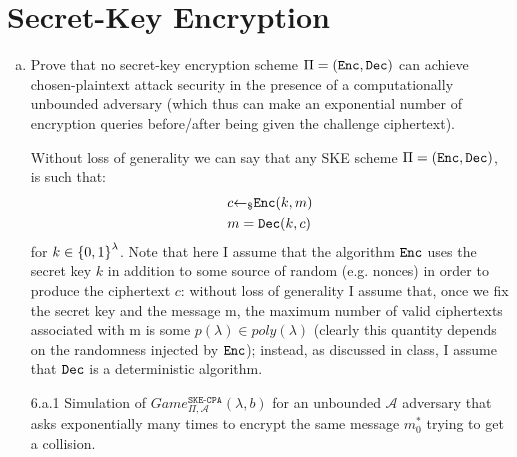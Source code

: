 \section{Secret-Key Encryption}
\begin{enumerate}[(a)]
	\item Prove that no secret-key encryption scheme $\Pi = (\texttt{Enc}, \texttt{Dec})$ can achieve chosen-plaintext attack security in the presence of a computationally unbounded adversary
	      (which thus can make an exponential number of encryption queries before/after being	given the challenge ciphertext).

	      \begin{solution}
		      Without loss of generality we can say that any SKE scheme $\Pi = (\texttt{Enc}, \texttt{Dec})$, is such that:
		      \begin{align*}
			       & c {\leftarrow_\$} \texttt{Enc}(k, m) \\
			       & m = \texttt{Dec}(k, c)
		      \end{align*}
		      for $k \in {\{0, 1\}}^\lambda$.
		      Note that here I assume that the algorithm $\texttt{Enc}$ uses the secret key $k$ in addition to some source of random (e.g. nonces) in order to produce the ciphertext $c$: without loss of generality I assume that, once we fix the secret key and the message m, the maximum number of valid ciphertexts associated with m is some $p(\lambda) \in poly(\lambda)$ (clearly this quantity depends on the randomness injected by $\texttt{Enc}$); instead, as discussed in class, I assume that $\texttt{Dec}$ is a deterministic algorithm.


		      \begin{cryptogame}
			      {6.a.1}
			      {Simulation of $Game_{\Pi, \mathcal{A}}^{\texttt{SKE-CPA}}(\lambda, b)$ for an unbounded $\mathcal{A}$ adversary that asks exponentially many times to encrypt the same message $m_0^*$ trying to get a collision.}
			      {}
			      {}
			      {}
			      \cseqdelay
			      \cseqbeginloop
			      \cseqendloop
			      \cseqdelay
		      \end{cryptogame}


\end{solution}
\end{enumerate}
